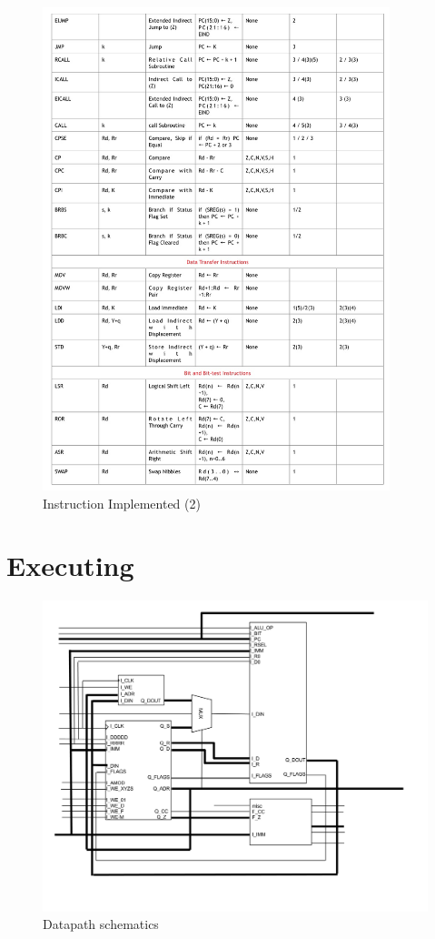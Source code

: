 \documentclass[12pt,a4paper]{report}
\begin{document}
\begin{figure}[h]
  \centering
  \includegraphics[width=0.9\textwidth]{IT2}
  \caption{Instruction Implemented (2)}
  \label{fig:it2}
\end{figure}
\section{Executing}
\begin{figure}[h]
  \centering
  \includegraphics[width=\textwidth]{datapath}
  \caption{Datapath schematics}
  \label{fig:datapath}
\end{figure}
\end{document}
